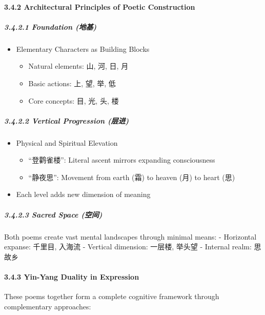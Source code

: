 \paragraph{3.4.2 Architectural Principles of Poetic
Construction}\label{architectural-principles-of-poetic-construction}

\subparagraph{3.4.2.1 Foundation (地基)}\label{foundation-ux5730ux57fa}

\begin{itemize}
\tightlist
\item
  Elementary Characters as Building Blocks

  \begin{itemize}
  \tightlist
  \item
    Natural elements: 山, 河, 日, 月
  \item
    Basic actions: 上, 望, 举, 低
  \item
    Core concepts: 目, 光, 头, 楼
  \end{itemize}
\end{itemize}

\subparagraph{3.4.2.2 Vertical Progression
(层进)}\label{vertical-progression-ux5c42ux8fdb}

\begin{itemize}
\tightlist
\item
  Physical and Spiritual Elevation

  \begin{itemize}
  \tightlist
  \item
    ``登鹳雀楼'': Literal ascent mirrors expanding consciousness
  \item
    ``静夜思'': Movement from earth (霜) to heaven (月) to heart (思)
  \end{itemize}
\item
  Each level adds new dimension of meaning
\end{itemize}

\subparagraph{3.4.2.3 Sacred Space
(空间)}\label{sacred-space-ux7a7aux95f4}

Both poems create vast mental landscapes through minimal means: -
Horizontal expanse: 千里目, 入海流 - Vertical dimension: 一层楼, 举头望
- Internal realm: 思故乡

\paragraph{3.4.3 Yin-Yang Duality in
Expression}\label{yin-yang-duality-in-expression}

These poems together form a complete cognitive framework through
complementary approaches:


